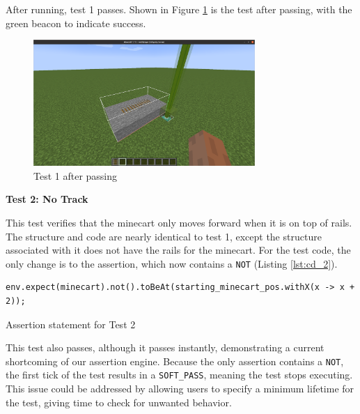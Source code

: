 \documentclass[12pt]{article}
\def\code#1{\texttt{#1}}
\begin{document}
\begin{onehalfspacing}
After running, test 1 passes. Shown in Figure \ref{fig:5_1_1_2} is the test after
passing, with the green beacon to indicate success.

\begin{figure}[H] 
    \centering
    \includegraphics[width=0.75\textwidth]{media/media/image12.png} 
    \caption{Test 1 after passing} 
    \label{fig:5_1_1_2}  
\end{figure}


\noindent\textbf{Test 2: No Track}

This test verifies that the minecart only moves forward when it is on
top of rails. The structure and code are nearly identical to test 1,
except the structure associated with it does not have the rails for the
minecart. For the test code, the only change is to the assertion, which
now contains a \code{NOT} (Listing \ref{lst:cd_2}).



\begin{listing}[H]
\begin{verbatim}
env.expect(minecart).not().toBeAt(starting_minecart_pos.withX(x -> x + 2));
\end{verbatim}
\caption{Assertion statement for Test 2}
\label{lst:cd_2}
\end{listing}


This test also passes, although it passes instantly, demonstrating a
current shortcoming of our assertion engine. Because the only assertion
contains a \code{NOT}, the first tick of the test results in a \code{SOFT\_PASS},
meaning the test stops executing. This issue could be addressed by
allowing users to specify a minimum lifetime for the test, giving time
to check for unwanted behavior.


\end{onehalfspacing}
\end{document}
